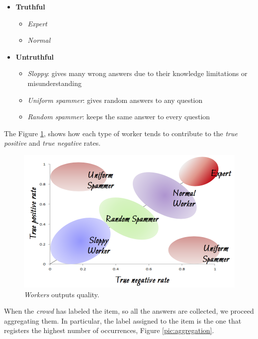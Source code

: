 \clearpage 

\begin{itemize}
\item \textbf{Truthful}
\begin{itemize}
\item \emph{Expert}
\item \emph{Normal}
\end{itemize}
\item \textbf{Untruthful}
\begin{itemize}
\item \emph{Sloppy}: gives many wrong answers due to their knowledge limitations or misunderstanding
\item \emph{Uniform spammer}: gives random answers to any question
\item \emph{Random spammer}: keeps the same answer to every question
\end{itemize}
\end{itemize}

The Figure \ref{pic:worker_crowdsourcing}, shows how each type of worker tends to contribute to the \emph{true positive} and \emph{true negative}  rates.

\begin{figure}[H]%
 \centering
 \includegraphics[width=13cm]{./img/08/worker_crowdsourcing}
 \caption{\label{pic:worker_crowdsourcing} \emph{Workers} outputs quality.}
\end{figure}

When the \emph{crowd} has labeled the item, so all the answers are collected, we proceed aggregating them. In particular, the label assigned to the item is the one that registers the highest number of occurrences, Figure \ref{pic:aggregation}.

